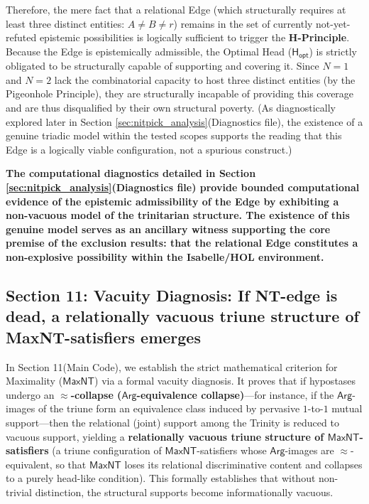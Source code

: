 \documentclass[a4paper, 11pt]{article}
\theoremstyle{plain}
\theoremstyle{definition}
\newcommand{\Arg}{\mathsf{Arg}}           %
\newcommand{\Hopt}{\mathsf{H_{opt}}}       %
\begin{document}
Therefore, the mere fact that a relational Edge (which structurally requires at least three distinct entities: $A \neq B \neq r$) remains in the set of currently not-yet-refuted epistemic possibilities is logically sufficient to trigger the \textbf{H-Principle}. Because the Edge is epistemically admissible, the Optimal Head ($\Hopt$) is strictly obligated to be structurally capable of supporting and covering it. Since $N=1$ and $N=2$ lack the combinatorial capacity to host three distinct entities (by the Pigeonhole Principle), they are structurally incapable of providing this coverage and are thus disqualified by their own structural poverty. (As diagnostically explored later in Section \ref{sec:nitpick_analysis}(Diagnostics file), the existence of a genuine triadic model within the tested scopes supports the reading that this Edge is a logically viable configuration, not a spurious construct.)

\textbf{The computational diagnostics detailed in Section \ref{sec:nitpick_analysis}(Diagnostics file) provide bounded computational evidence of the epistemic admissibility of the Edge by exhibiting a non-vacuous model of the trinitarian structure. The existence of this genuine model serves as an ancillary witness supporting the core premise of the exclusion results: that the relational Edge constitutes a non-explosive possibility within the Isabelle/HOL environment.}

\subsection{Section 11: Vacuity Diagnosis: If NT-edge is dead, a relationally vacuous triune structure of MaxNT-satisfiers emerges}
In Section 11(Main Code), we establish the strict mathematical criterion for Maximality ($\mathsf{MaxNT}$) via a formal vacuity diagnosis. It proves that if hypostases undergo an \textbf{$\approx$-collapse ($\Arg$-equivalence collapse)}---for instance, if the $\Arg$-images of the triune form an equivalence class induced by pervasive $1$-to-$1$ mutual support---then the relational (joint) support among the Trinity is reduced to vacuous support, yielding a \textbf{relationally vacuous triune structure of $\mathsf{MaxNT}$-satisfiers} (a triune configuration of $\mathsf{MaxNT}$-satisfiers whose $\Arg$-images are $\approx$-equivalent, so that $\mathsf{MaxNT}$ loses its relational discriminative content and collapses to a purely head-like condition). This formally establishes that without non-trivial distinction, the structural supports become informationally vacuous.
\end{document}
